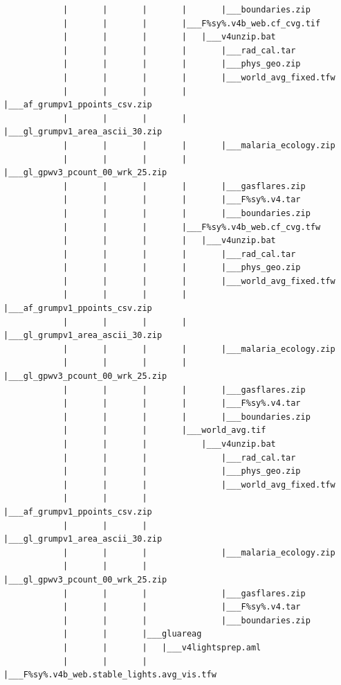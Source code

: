\documentclass[
]{book}
\begin{document}
\begin{verbatim}
            |       |       |       |       |___boundaries.zip
            |       |       |       |___F%sy%.v4b_web.cf_cvg.tif
            |       |       |       |   |___v4unzip.bat
            |       |       |       |       |___rad_cal.tar
            |       |       |       |       |___phys_geo.zip
            |       |       |       |       |___world_avg_fixed.tfw
            |       |       |       |       |___af_grumpv1_ppoints_csv.zip
            |       |       |       |       |___gl_grumpv1_area_ascii_30.zip
            |       |       |       |       |___malaria_ecology.zip
            |       |       |       |       |___gl_gpwv3_pcount_00_wrk_25.zip
            |       |       |       |       |___gasflares.zip
            |       |       |       |       |___F%sy%.v4.tar
            |       |       |       |       |___boundaries.zip
            |       |       |       |___F%sy%.v4b_web.cf_cvg.tfw
            |       |       |       |   |___v4unzip.bat
            |       |       |       |       |___rad_cal.tar
            |       |       |       |       |___phys_geo.zip
            |       |       |       |       |___world_avg_fixed.tfw
            |       |       |       |       |___af_grumpv1_ppoints_csv.zip
            |       |       |       |       |___gl_grumpv1_area_ascii_30.zip
            |       |       |       |       |___malaria_ecology.zip
            |       |       |       |       |___gl_gpwv3_pcount_00_wrk_25.zip
            |       |       |       |       |___gasflares.zip
            |       |       |       |       |___F%sy%.v4.tar
            |       |       |       |       |___boundaries.zip
            |       |       |       |___world_avg.tif
            |       |       |           |___v4unzip.bat
            |       |       |               |___rad_cal.tar
            |       |       |               |___phys_geo.zip
            |       |       |               |___world_avg_fixed.tfw
            |       |       |               |___af_grumpv1_ppoints_csv.zip
            |       |       |               |___gl_grumpv1_area_ascii_30.zip
            |       |       |               |___malaria_ecology.zip
            |       |       |               |___gl_gpwv3_pcount_00_wrk_25.zip
            |       |       |               |___gasflares.zip
            |       |       |               |___F%sy%.v4.tar
            |       |       |               |___boundaries.zip
            |       |       |___gluareag
            |       |       |   |___v4lightsprep.aml
            |       |       |       |___F%sy%.v4b_web.stable_lights.avg_vis.tfw

\end{verbatim}
\end{document}
